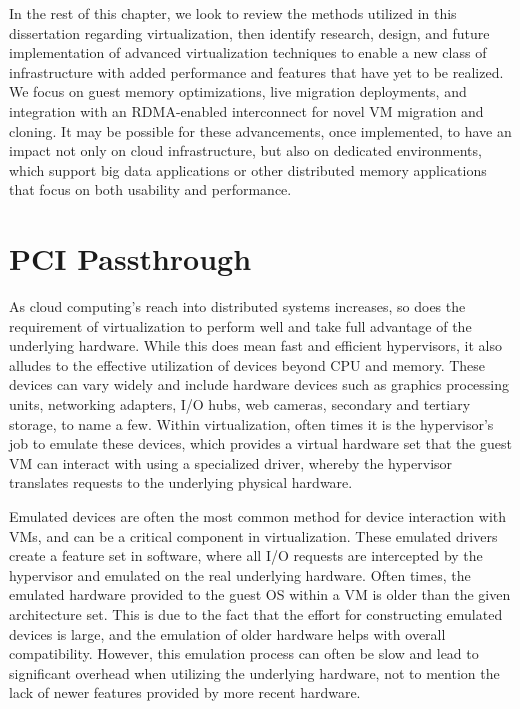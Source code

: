 In the rest of this chapter, we look to review the methods utilized in this dissertation regarding virtualization, then identify research, design, and future implementation of advanced virtualization techniques to enable a new class of infrastructure with added performance and features that have yet to be realized.  We focus on guest memory optimizations, live migration deployments, and integration with an RDMA-enabled interconnect for novel VM migration and cloning.  It may be possible for these advancements, once implemented, to have an impact not only on cloud infrastructure, but also on dedicated environments, which support big data applications or other distributed memory applications that focus on both usability and performance.


\section{PCI Passthrough}

As cloud computing's reach into distributed systems increases, so does the requirement of virtualization to perform well and take full advantage of the underlying hardware. While this does mean fast and efficient hypervisors, it also alludes to the effective utilization of devices beyond CPU and memory.  These devices can vary widely and include hardware devices such as graphics processing units, networking adapters,  I/O hubs, web cameras, secondary and tertiary storage, to name a few. Within virtualization, often times it is the hypervisor's job to emulate these devices, which provides a virtual hardware set that the guest VM can interact with using a specialized driver, whereby the hypervisor translates requests to the underlying physical hardware.

Emulated devices are often the most common method for device interaction with VMs, and can be a critical component in virtualization. These emulated drivers create a feature set in software, where all I/O requests are intercepted by the hypervisor and emulated on the real underlying hardware. Often times, the emulated hardware provided to the guest OS within a VM is older than the given architecture set. This is due to the fact that the effort for constructing emulated devices is large, and the emulation of older hardware helps with overall compatibility. However, this emulation process can often be slow and  lead to significant overhead when utilizing the underlying hardware, not to mention the lack of newer features provided by more recent hardware.

